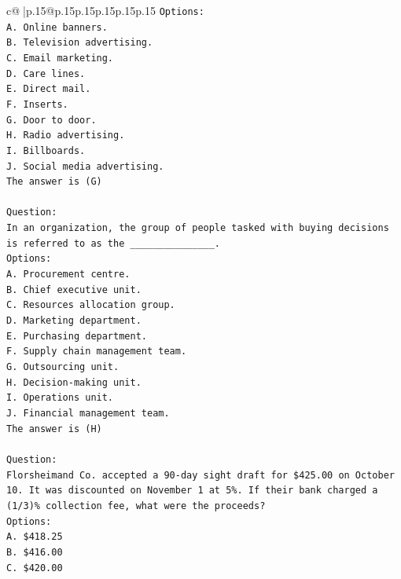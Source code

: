 \documentclass{article}
\begin{document}
{\begin{supertabular}{c@{$\;$}|p{.15\linewidth}@{}p{.15\linewidth}p{.15\linewidth}p{.15\linewidth}p{.15\linewidth}p{.15\linewidth}}
{{{\texttt{Options:} \\
\texttt{A. Online banners.} \\
\texttt{B. Television advertising.} \\
\texttt{C. Email marketing.} \\
\texttt{D. Care lines.} \\
\texttt{E. Direct mail.} \\
\texttt{F. Inserts.} \\
\texttt{G. Door to door.} \\
\texttt{H. Radio advertising.} \\
\texttt{I. Billboards.} \\
\texttt{J. Social media advertising.} \\
\texttt{The answer is (G)} \\
\\ 
\texttt{Question:} \\
\texttt{In an organization, the group of people tasked with buying decisions is referred to as the \_\_\_\_\_\_\_\_\_\_\_\_\_\_\_.} \\
\texttt{Options:} \\
\texttt{A. Procurement centre.} \\
\texttt{B. Chief executive unit.} \\
\texttt{C. Resources allocation group.} \\
\texttt{D. Marketing department.} \\
\texttt{E. Purchasing department.} \\
\texttt{F. Supply chain management team.} \\
\texttt{G. Outsourcing unit.} \\
\texttt{H. Decision{-}making unit.} \\
\texttt{I. Operations unit.} \\
\texttt{J. Financial management team.} \\
\texttt{The answer is (H)} \\
\\ 
\texttt{Question:} \\
\texttt{Florsheimand Co. accepted a 90{-}day sight draft for \$425.00 on October 10. It was discounted on November 1 at 5\%. If their bank charged a (1/3)\% collection fee, what were the proceeds?} \\
\texttt{Options:} \\
\texttt{A. \$418.25} \\
\texttt{B. \$416.00} \\
\texttt{C. \$420.00} \\
}}}
\end{supertabular}}
\end{document}
